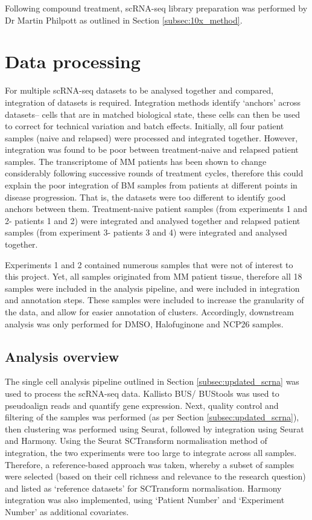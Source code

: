 Following compound treatment, scRNA-seq library preparation was performed by Dr Martin Philpott as outlined in Section \ref{subsec:10x_method}.


\section{Data processing}
For multiple scRNA-seq datasets to be analysed together and compared, integration of datasets is required.
Integration methods identify `anchors' across datasets-- cells that are in matched biological state, these cells can then be used to correct for technical variation and batch effects.
Initially, all four patient samples (naive and relapsed) were processed and integrated together.
However, integration was found to be poor between treatment-naive and relapsed patient samples.
The transcriptome of MM patients has been shown to change considerably following successive rounds of treatment cycles, therefore this could explain the poor integration of BM samples from patients at different points in disease progression.
That is, the datasets were too different to identify good anchors between them.
Treatment-naive patient samples (from experiments 1 and 2- patients 1 and 2) were integrated and analysed together and relapsed patient samples (from experiment 3- patients 3 and 4) were integrated and analysed together.

Experiments 1 and 2 contained numerous samples that were not of interest to this project.
Yet, all samples originated from MM patient tissue, therefore all 18 samples were included in the analysis pipeline, and were included in integration and annotation steps.
These samples were included to increase the granularity of the data, and allow for easier annotation of clusters.
Accordingly, downstream analysis was only performed for DMSO, Halofuginone and NCP26 samples.

\subsection{Analysis overview}

The single cell analysis pipeline outlined in Section \ref{subsec:updated_scrna} was used to process the scRNA-seq data.
Kallisto BUS/ BUStools was used to pseudoalign reads and quantify gene expression.
Next, quality control and filtering of the samples was performed (as per Section \ref{subsec:updated_scrna}), then clustering was performed using Seurat, followed by integration using Seurat and Harmony.
Using the Seurat SCTransform normalisation method of integration, the two experiments were too large to integrate across all samples.
Therefore, a reference-based approach was taken, whereby a subset of samples were selected (based on their cell richness and relevance to the research question) and listed as `reference datasets' for SCTransform normalisation.
Harmony integration was also implemented, using `Patient Number' and `Experiment Number' as additional covariates.

